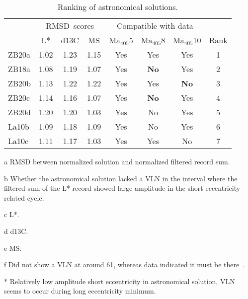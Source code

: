 \documentclass[draft]{agujournal2019}
\newcommand{\appr}{\raise.17ex\hbox{\(\scriptstyle\sim\)}} %
\newcommand{\ma}[1]{Ma\(_{405}\)#1} %
\begin{document}
\begin{table}
\begin{threeparttable}
\caption{
Ranking of astronomical solutions.
\label{tab:results}}
\centering
\begin{tabular}{lccccccc}
 & \multicolumn{3}{c}{\gls{RMSD}~scores\tnote{a}} & \multicolumn{3}{c}{Compatible with data\tnote{b}} & \\
 & \gls{L*}\tnote{c} & \gls{d13C}\tnote{d} & \gls{MS}\tnote{e} & \ma{5} & \ma{8} & \ma{10} & Rank \\
\hline
ZB20a & 1.02 & 1.23 & 1.15 & Yes & Yes & Yes & 1\\
ZB18a & 1.08 & 1.19 & 1.07 & Yes & \textbf{No} & Yes & 2\\
ZB20b & 1.13 & 1.22 & 1.22 & Yes & Yes & \textbf{No} & 3\\
ZB20c & 1.14 & 1.16 & 1.07 & Yes & \textbf{No} & Yes & 4\\
ZB20d & 1.20 & 1.20 & 1.03 & Yes & No\tnote{*} & Yes & 5\\
La10b & 1.09 & 1.18 & 1.09 & Yes & No\tnote{*} & Yes & 6\tnote{f}\\
La10c & 1.11 & 1.17 & 1.03 & Yes & Yes & No\tnote{*} & 7\tnote{f}\\
\hline
\end{tabular}
\begin{tablenotes}
    \item %
    \item [a] \Acrlong{RMSD} between normalized solution and normalized filtered record sum.
    \item [b] Whether the astronomical solution lacked a \acrfull{VLN} in the interval where the filtered sum of the \gls{L*} record showed large amplitude in the short eccentricity related cycle.
    \item [c] \Acrfull{L*}.
    \item [d] \Acrfull{d13C}.
    \item [e] \Acrfull{MS}.
    \item [f] Did not show a \gls{VLN} at around \qty{61}{\millionyearago},
    whereas data indicated it must be there~\cite{ZeebeLourens2022EPSL}.
    \item [*] Relatively low amplitude short eccentricity in astronomical solution, \gls{VLN} seems to occur during long eccentricity minimum.
\end{tablenotes}
\end{threeparttable}
\end{table}
\end{document}
